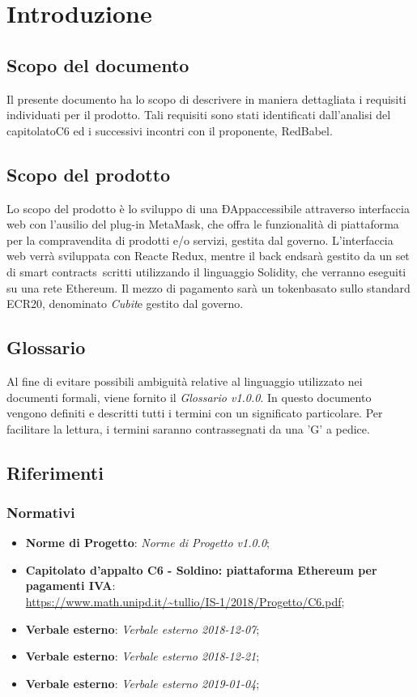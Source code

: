 \section{Introduzione} 
\subsection{Scopo del documento}
Il presente documento ha lo scopo di descrivere in maniera dettagliata i requisiti individuati per il prodotto. Tali requisiti sono stati identificati dall'analisi del capitolato\glosp C6 ed i successivi incontri con il proponente, RedBabel.
\subsection{Scopo del prodotto}
Lo scopo del prodotto è lo sviluppo di una ÐApp\glosp accessibile attraverso interfaccia web con l'ausilio del plug-in MetaMask\glo, che offra le funzionalità di piattaforma per la compravendita di prodotti e/o servizi, gestita dal governo\glo. L'interfaccia web verrà sviluppata con React\glosp e Redux\glo, mentre il back end\glosp sarà gestito da un set di smart contracts\ scritti utilizzando il linguaggio Solidity\glo, che verranno eseguiti su una rete Ethereum\glo.  Il mezzo di pagamento sarà un token\glosp basato sullo standard ECR20\glo, denominato \textit{Cubit}\glosp e gestito dal governo\glo.

\subsection{Glossario}
Al fine di evitare possibili ambiguità relative al linguaggio utilizzato nei documenti formali, viene fornito il \textit{Glossario v1.0.0}. In questo documento vengono definiti e descritti tutti i termini con un significato particolare. Per facilitare la lettura, i termini saranno contrassegnati da una 'G' a pedice.
\subsection{Riferimenti}
\subsubsection{Normativi}
\begin{itemize}
	\item \textbf{Norme di Progetto}: \textit{Norme di Progetto v1.0.0};

	\item \textbf{Capitolato d'appalto C6 - Soldino: piattaforma Ethereum per pagamenti IVA}: \\ \url{ https://www.math.unipd.it/~tullio/IS-1/2018/Progetto/C6.pdf};
	\item \textbf{Verbale esterno}: \textit{Verbale esterno 2018-12-07};
	\item \textbf{Verbale esterno}: \textit{Verbale esterno 2018-12-21};
	\item \textbf{Verbale esterno}: \textit{Verbale esterno 2019-01-04};
\end{itemize}
